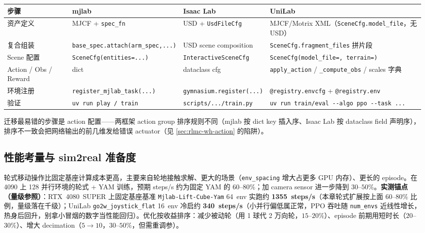 \begin{center}
\small
\begin{tabular}{@{}llll@{}}
\toprule
步骤 & mjlab & Isaac Lab & UniLab \\
\midrule
资产定义 & MJCF + \verb|spec_fn| & USD + \verb|UsdFileCfg| & MJCF/Motrix XML（\verb|SceneCfg.model_file|，无 USD） \\
复合组装 & \verb|base_spec.attach(arm_spec,...)| & USD scene composition & \verb|SceneCfg.fragment_files| 拼片段 \\
Scene 配置 & \verb|SceneCfg(entities=...)| & \verb|InteractiveSceneCfg| & \verb|SceneCfg(model_file=, terrain=)| \\
Action / Obs / Reward & dict & dataclass cfg & \verb|apply_action| / \verb|_compute_obs| / scales 字典 \\
环境注册 & \verb|register_mjlab_task(...)| & \verb|gymnasium.register(...)| & \verb|@registry.envcfg| + \verb|@registry.env| \\
验证 & \verb|uv run play / train| & \verb|scripts/.../train.py| & \verb|uv run train/eval --algo ppo --task ...| \\
\bottomrule
\end{tabular}
\end{center}

迁移最易错的步骤是 action 配置——两框架 action group 排序规则不同（mjlab 按 dict key 插入序、Isaac Lab 按 dataclass field 声明序），排序不一致会把网络输出的前几维发给错误 actuator（见 \cref{sec:rlmc-wh-action} 的陷阱）。

\subsection{性能考量与 sim2real 准备度}
\label{sec:rlmc-wh-perf}

轮式移动操作比固定基座计算成本更高，主要来自轮地接触求解、更大的场景（\verb|env_spacing| 增大占更多 GPU 内存）、更长的 episode。在 4090 上 128 并行环境的轮式 + YAM 训练，预期 steps/s 约为固定 YAM 的 $60$--$80\%$；加 camera sensor 进一步降到 $30$--$50\%$。\textbf{实测锚点（量级参照）}：RTX~4080~SUPER 上固定基座基准 \verb|Mjlab-Lift-Cube-Yam| 64~env 实跑约 \textbf{1355~steps/s}（本章轮式扩展按上面 $60$--$80\%$ 比例，量级落在千级）；UniLab \verb|go2w_joystick_flat| 16~env 冷启约 \textbf{340~steps/s}（小并行偏低属正常，PPO 吞吐随 \verb|num_envs| 近线性增长，热身后回升，别拿小冒烟的数字当性能回归）。优化按收益排序：减少被动轮（用 1 球代 2 万向轮，$15$--$20\%$）、episode 前期用短时长（$20$--$30\%$）、增大 decimation（$5\to10$，$30$--$50\%$，但需重调参）。

